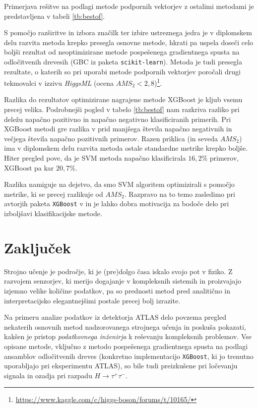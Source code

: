 \documentclass[11pt,a4paper,openany]{book}
\begin{document}
Primerjava rešitve na podlagi metode podpornih vektorjev z ostalimi metodami je predstavljena v tabeli \ref{tb:bestof}.

S pomočjo razširitve in izbora značilk ter izbire ustreznega jedra je v diplomskem delu razvita metoda krepko presegla osnovne metode, hkrati pa uspela doseči celo boljši rezultat od neoptimizirane metode pospešenega gradientnega spusta na odločitvenih drevesih (GBC iz paketa \texttt{scikit-learn}). Metoda je tudi presegla rezultate, o katerih so pri uporabi metode podpornih vektorjev poročali drugi tekmovalci v izzivu \textit{HiggsML} (ocena $AMS_2 < 2,8$)\footnote{\url{https://www.kaggle.com/c/higgs-boson/forums/t/10165/}}.

Razlika do rezultatov optimizirane nagrajene metode XGBoost je kljub vsemu precej velika. Podrobnejši pogled v tabelo \ref{tb:bestof} nam razkriva razliko pri deležu napačno pozitivno in napačno negativno klasificiranih primerih. Pri XGBoost metodi gre razlika v prid manjšega števila napačno negativnih in večjega števila napačno pozitivnih primerov. Razen priklica (in seveda $AMS_2$) ima v diplomskem delu razvita metoda ostale standardne metrike krepko boljše. Hiter pregled pove, da je SVM metoda napačno klasificirala $16,2\%$ primerov, XGBoost pa kar $20,7\%$. 

Razlika namiguje na dejstvo, da smo SVM algoritem optimizirali s pomočjo metrike, ki se precej razlikuje od $AMS_2$. Razpravo na to temo zasledimo pri avtorjih paketa \texttt{XGBoost} v \cite{chen2014} in je lahko dobra motivacija za bodoče delo pri izboljšavi klasifikacijske metode.

\chapter*{Zaključek}

Strojno učenje je področje, ki je (pre)dolgo časa iskalo svojo pot v fiziko. Z razvojem senzorjev, ki merijo dogajanje v kompleksnih sistemih in proizvajajo izjemno velike količine podatkov, pa so prednosti metod pred analitično in interpretacijsko elegantnejšimi postale precej bolj izrazite. 

Na primeru analize podatkov iz detektorja ATLAS delo povzema pregled nekaterih osnovnih metod nadzorovanega strojnega učenja in poskuša pokazati, kakšen je pristop \textit{podatkovnega inženirja} k reševanju kompleksnih problemov. Vse opisane metode, vključno z metodo pospešenega gradientnega spusta na podlagi ansamblov odločitvenih dreves (konkretno implementacijo \texttt{XGBoost}, ki jo trenutno uporabljajo pri eksperimentu ATLAS), so bile tudi preizkušene pri ločevanju signala in ozadja pri razpadu $H \rightarrow \tau^+\tau^-$.
\end{document}
